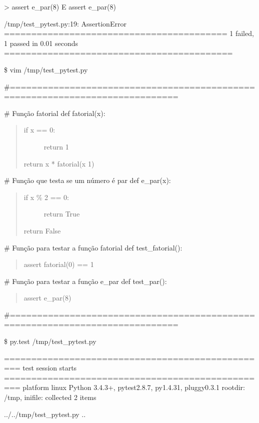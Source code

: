 \documentclass[letterpaper,10pt,brazil]{sphinxmanual}
\begin{document}
\textgreater{}       assert e\_par(8)
E       assert e\_par(8)

/tmp/test\_pytest.py:19: AssertionError
========================================= 1 failed, 1 passed in 0.01 seconds ==========================================

\$ vim /tmp/test\_pytest.py

\#=============================================================================

\# Função fatorial
def fatorial(x):
\begin{quote}
\begin{description}
\item[{if x == 0:}] \leavevmode
return 1

\end{description}

return x * fatorial(x \sphinxhyphen{} 1)
\end{quote}

\# Função que testa se um número é par
def e\_par(x):
\begin{quote}
\begin{description}
\item[{if x \% 2 == 0:}] \leavevmode
return True

\end{description}

return False
\end{quote}

\# Função para testar a função fatorial
def test\_fatorial():
\begin{quote}

assert fatorial(0) == 1
\end{quote}

\# Função para testar a função e\_par
def test\_par():
\begin{quote}

assert e\_par(8)
\end{quote}

\#=============================================================================

\$ py.test /tmp/test\_pytest.py

================================================= test session starts =================================================
platform linux \textendash{} Python 3.4.3+, pytest\sphinxhyphen{}2.8.7, py\sphinxhyphen{}1.4.31, pluggy\sphinxhyphen{}0.3.1
rootdir: /tmp, inifile:
collected 2 items

../../tmp/test\_pytest.py ..
\end{document}
